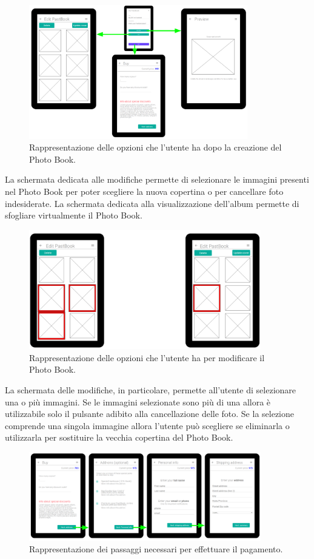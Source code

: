 				\begin{figure}[H]
					\centering
					\includegraphics[width=0.85\textwidth]{capitolo_3/immagini/wireframe_2.png}
					\caption{Rappresentazione delle opzioni che l'utente ha dopo la creazione del Photo Book.}
				\end{figure}
				\noindent La schermata dedicata alle modifiche permette di selezionare le immagini presenti nel Photo Book per poter
				scegliere la nuova copertina o per cancellare foto indesiderate. La schermata dedicata alla visualizzazione
				dell'album permette di sfogliare virtualmente il Photo Book.
				\begin{figure}[H]
					\centering
					\includegraphics[width=0.9\textwidth]{capitolo_3/immagini/wireframe_3.png}
					\caption{Rappresentazione delle opzioni che l'utente ha per modificare il Photo Book.}
				\end{figure}
				\noindent La schermata delle modifiche, in particolare, permette all'utente di selezionare una o più immagini. Se le
				immagini selezionate sono più di una allora è utilizzabile solo il pulsante adibito alla cancellazione delle foto.
				Se la selezione comprende una singola immagine allora l'utente può scegliere se eliminarla o utilizzarla per
				sostituire la vecchia copertina del Photo Book.
				\begin{figure}[H]
					\centering
					\includegraphics[width=0.9\textwidth]{capitolo_3/immagini/wireframe_4.png}
					\caption{Rappresentazione dei passaggi necessari per effettuare il pagamento.}
				\end{figure}
